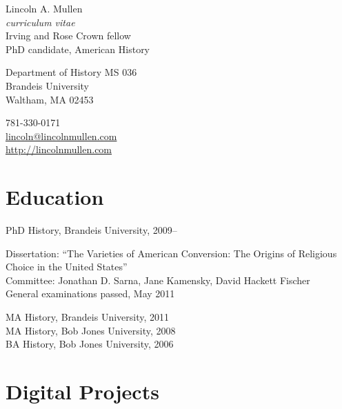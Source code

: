 \documentclass[11pt]{article}
\begin{document}
{\LARGE Lincoln A. Mullen}\\
\emph{curriculum vitae}\\[0.5cm]

Irving and Rose Crown fellow\\
PhD candidate, American History

\begin{multicols}{2}
Department of History MS 036\\
Brandeis University\\
Waltham, MA 02453

\columnbreak

781-330-0171\\
\href{mailto:lincoln@lincolnmullen.com}{lincoln@lincolnmullen.com}\\
\href{http://lincolnmullen.com}{http://lincolnmullen.com}
\end{multicols}


\vskip 0.5cm


\section{Education}
PhD History, Brandeis University, 2009--

\begingroup
{}
Dissertation: ``The Varieties of American Conversion: The Origins of 
Religious Choice in the United States''\\[1pt]
Committee:  Jonathan D. Sarna, Jane Kamensky, David Hackett 
Fischer\\[1pt]
General examinations passed, May 2011
\par
\endgroup

MA History, Brandeis University, 2011\\
MA History, Bob Jones University, 2008\\
BA History, Bob Jones University, 2006




\section{Digital Projects}
\end{document}
